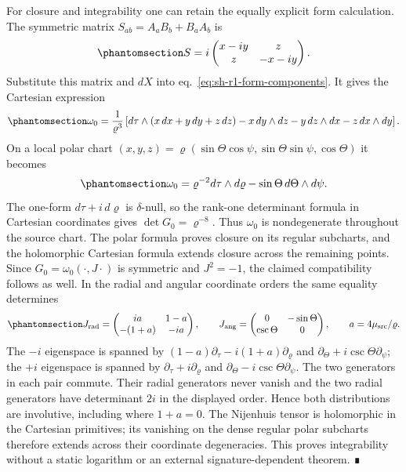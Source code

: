 \documentclass[
  english,
  11pt,
  reqno]{amsart}
\begin{document}
For closure and integrability one can retain the equally explicit form
calculation. The symmetric matrix \(S_{ab}=A_aB_b+B_aA_b\) is
\begin{equation}\protect\phantomsection\label{eq:sh-r1-symmetric-spinor-matrix}{
 S=i\begin{pmatrix}x-iy&z\\z&-x-iy\end{pmatrix}.
}\end{equation} Substitute this matrix and \(dX\) into
eq.~\ref{eq:sh-r1-form-components}. It gives the Cartesian expression
\begin{equation}\protect\phantomsection\label{eq:sh-r1-cartesian-form}{
 \omega_0=\frac1{\varrho^3}
 \left[d\tau\wedge(x\,dx+y\,dy+z\,dz)
       -x\,dy\wedge dz-y\,dz\wedge dx-z\,dx\wedge dy\right].
}\end{equation} On a local polar chart
\((x,y,z)=\varrho(\sin\Theta\cos\psi,\sin\Theta\sin\psi,\cos\Theta)\) it
becomes
\begin{equation}\protect\phantomsection\label{eq:sh-r1-polar-form}{
 \omega_0=\varrho^{-2}d\tau\wedge d\varrho
                -\sin\Theta\,d\Theta\wedge d\psi.
}\end{equation} The one-form \(d\tau+i\,d\varrho\) is \(\delta\)-null,
so the rank-one determinant formula in Cartesian coordinates gives
\(\det G_0=\varrho^{-8}\). Thus \(\omega_0\) is nondegenerate throughout
the source chart. The polar formula proves closure on its regular
subcharts, and the holomorphic Cartesian formula extends closure across
the remaining points. Since \(G_0=\omega_0(\cdot,J\cdot)\) is symmetric
and \(J^2=-1\), the claimed compatibility follows as well. In the radial
and angular coordinate orders the same equality determines
\begin{equation}\protect\phantomsection\label{eq:sh-r1-source-complex-structure}{
 J_{\rm rad}=\begin{pmatrix}ia&1-a\\-(1+a)&-ia\end{pmatrix},\qquad
 J_{\rm ang}=\begin{pmatrix}0&-\sin\Theta\\\csc\Theta&0\end{pmatrix},
 \qquad a=4\mu_{\rm src}/\varrho.
}\end{equation} The \(-i\) eigenspace is spanned by
\((1-a)\partial_\tau-i(1+a)\partial_\varrho\) and
\(\partial_\Theta+i\csc\Theta\partial_\psi\); the \(+i\) eigenspace is
spanned by \(\partial_\tau+i\partial_\varrho\) and
\(\partial_\Theta-i\csc\Theta\partial_\psi\). The two generators in each
pair commute. Their radial generators never vanish and the two radial
generators have determinant \(2i\) in the displayed order. Hence both
distributions are involutive, including where \(1+a=0\). The Nijenhuis
tensor is holomorphic in the Cartesian primitives; its vanishing on the
dense regular polar subcharts therefore extends across their coordinate
degeneracies. This proves integrability without a static logarithm or an
external signature-dependent theorem. ∎
\end{document}

